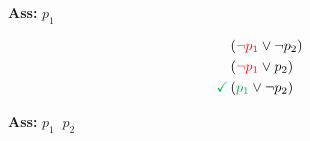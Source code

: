 \begin{minipage}[t]{0.2\textwidth}
  \textbf{Ass:} $p_1$
  \centering{}
  \label{fig1}
\end{minipage}
\begin{minipage}[t]{0.2\textwidth}
$$
\begin{aligned}
&\left(\text{\textcolor{red}{$\neg p_1$}} \vee \neg p_{2}\right) \\
&\left(\text{\textcolor{red}{$\neg p_1$}} \vee p_{2}\right) \\
\textcolor{Green}{\checkmark} &\left(\text{\textcolor{Green}{$p_1$}} \vee \neg p_{2}\right)
\end{aligned}
$$
\vspace{0.25cm}
\end{minipage}
\begin{minipage}[t]{0.2\textwidth}
  \textbf{Ass:} $p_1 \;\; p_2$
  \centering{}
  \label{fig1}
\end{minipage}
